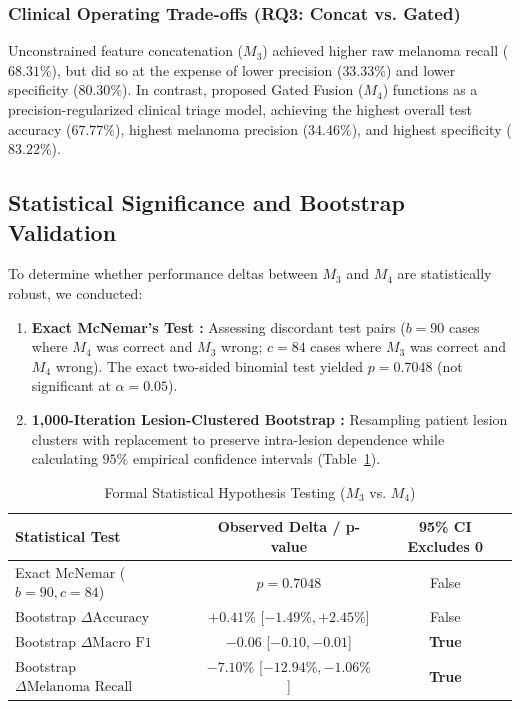\documentclass[journal,10pt,twocolumn]{IEEEtran}
\begin{document}
\subsubsection{Clinical Operating Trade-offs (RQ3: Concat vs. Gated)}
Unconstrained feature concatenation ($M_3$) achieved higher raw melanoma recall ($68.31\%$), but did so at the expense of lower precision ($33.33\%$) and lower specificity ($80.30\%$). In contrast, proposed Gated Fusion ($M_4$) functions as a precision-regularized clinical triage model, achieving the highest overall test accuracy ($67.77\%$), highest melanoma precision ($34.46\%$), and highest specificity ($83.22\%$).

\subsection{Statistical Significance and Bootstrap Validation}
To determine whether performance deltas between $M_3$ and $M_4$ are statistically robust, we conducted:
\begin{enumerate}
    \item \textbf{Exact McNemar's Test \cite{mcnemar1947note}:} Assessing discordant test pairs ($b=90$ cases where $M_4$ was correct and $M_3$ wrong; $c=84$ cases where $M_3$ was correct and $M_4$ wrong). The exact two-sided binomial test yielded $p = 0.7048$ (not significant at $\alpha = 0.05$).
    \item \textbf{1,000-Iteration Lesion-Clustered Bootstrap \cite{efron1994introduction}:} Resampling patient lesion clusters with replacement to preserve intra-lesion dependence while calculating $95\%$ empirical confidence intervals (Table~\ref{tab:stats}).
\end{enumerate}

\begin{table}[ht]
\centering
\caption{Formal Statistical Hypothesis Testing ($M_3$ vs. $M_4$)}
\label{tab:stats}
\begin{tabular}{lcc}
\toprule
\textbf{Statistical Test} & \textbf{Observed Delta / p-value} & \textbf{95\% CI Excludes 0} \\
\midrule
Exact McNemar ($b=90, c=84$) & $p = 0.7048$ & False \\
Bootstrap $\Delta\text{Accuracy}$ & $+0.41\%$ [$-1.49\%, +2.45\%$] & False \\
Bootstrap $\Delta\text{Macro F1}$ & $-0.06$ [$-0.10, -0.01$] & \textbf{True} \\
Bootstrap $\Delta\text{Melanoma Recall}$ & $-7.10\%$ [$-12.94\%, -1.06\%$] & \textbf{True} \\
\bottomrule
\end{tabular}
\end{table}
\end{document}
